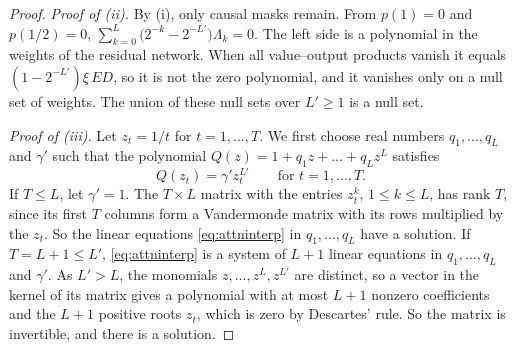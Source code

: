 \documentclass[10pt]{article}
\theoremstyle{definition}
\theoremstyle{remark}
\begin{document}
\begin{proof}
\emph{Proof of (ii).} By (i), only causal masks remain. From $p(1) = 0$ and $p(1/2) = 0$, $\sum_{k=0}^{L}\big(2^{-k} - 2^{-L'}\big)\Lambda_k = 0$. The left side is a polynomial in the weights of the residual network. When all value--output products vanish it equals $(1 - 2^{-L'})\xi\,ED$, so it is not the zero polynomial, and it vanishes only on a null set of weights. The union of these null sets over $L' \ge 1$ is a null set.

\emph{Proof of (iii).} Let $z_t = 1/t$ for $t = 1, \dots, T$. We first choose real numbers $q_1, \dots, q_L$ and $\gamma'$ such that the polynomial $Q(z) = 1 + q_1z + \dots + q_Lz^L$ satisfies
\begin{equation}\label{eq:attninterp}
Q(z_t) = \gamma' z_t^{L'} \qquad\text{for } t = 1, \dots, T.
\end{equation}
If $T \le L$, let $\gamma' = 1$. The $T\times L$ matrix with the entries $z_t^k$, $1 \le k \le L$, has rank $T$, since its first $T$ columns form a Vandermonde matrix with its rows multiplied by the $z_t$. So the linear equations \eqref{eq:attninterp} in $q_1, \dots, q_L$ have a solution. If $T = L + 1 \le L'$, \cref{eq:attninterp} is a system of $L + 1$ linear equations in $q_1, \dots, q_L$ and $\gamma'$. As $L' > L$, the monomials $z, \dots, z^L, z^{L'}$ are distinct, so a vector in the kernel of its matrix gives a polynomial with at most $L + 1$ nonzero coefficients and the $L + 1$ positive roots $z_t$, which is zero by Descartes' rule. So the matrix is invertible, and there is a solution.


\end{proof}
\end{document}
